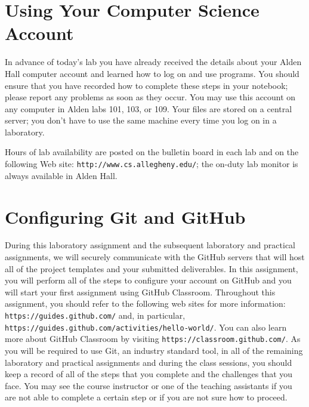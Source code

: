 \documentclass[11pt]{article}
\newcommand{\url}[1]{\lstinline{#1}}
\begin{document}
\section*{Using Your Computer Science Account}

In advance of today's lab you have already received the details about your Alden Hall computer account and learned how
to log on and use programs. You should ensure that you have recorded how to complete these steps in your notebook;
please report any problems as soon as they occur. You may use this account on any computer in Alden labs 101, 103, or
109. Your files are stored on a central server; you don't have to use the same machine every time you log on in a
laboratory.

Hours of lab availability are posted on the bulletin board in each lab and on the following Web site:
\url{http://www.cs.allegheny.edu/}; the on-duty lab monitor is always available in Alden Hall.

\section*{Configuring Git and GitHub}

During this laboratory assignment and the subsequent laboratory and practical assignments, we will securely communicate
with the GitHub servers that will host all of the project templates and your submitted deliverables. In this assignment,
you will perform all of the steps to configure your account on GitHub and you will start your first assignment using
GitHub Classroom. Throughout this assignment, you should refer to the following web sites for more information:
\url{https://guides.github.com/} and, in particular, \url{https://guides.github.com/activities/hello-world/}. You can
also learn more about GitHub Classroom by visiting \url{https://classroom.github.com/}. As you will be required to use
Git, an industry standard tool, in all of the remaining laboratory and practical assignments and during the class
sessions, you should keep a record of all of the steps that you complete and the challenges that you face. You may see
the course instructor or one of the teaching assistants if you are not able to complete a certain step or if you are not
sure how to proceed.
\end{document}
